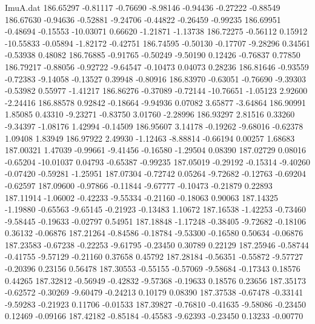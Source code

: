 \begin{filecontents}{ImuA.dat}
 186.65297   -0.81117   -0.76690   -8.98146   -0.94436   -0.27222   -0.88549
 186.67630   -0.94636   -0.52881   -9.24706   -0.44822   -0.26459   -0.99235
 186.69951   -0.48694   -0.15553  -10.03071    0.66620   -1.21871   -1.13738
 186.72275   -0.56112    0.15912  -10.55833   -0.05894   -1.82172   -0.42751
 186.74595   -0.50130   -0.17707   -9.28296    0.34561   -0.53938    0.48082
 186.76885   -0.91765   -0.50249   -9.50190    0.12426   -0.76837    0.77850
 186.79217   -0.88056   -0.92722   -9.64547   -0.10473    0.04073    0.28236
 186.81646   -0.93559   -0.72383   -9.14058   -0.13527    0.39948   -0.80916
 186.83970   -0.63051   -0.76690   -9.39303   -0.53982    0.55977   -1.41217
 186.86276   -0.37089   -0.72144  -10.76651   -1.05123    2.92600   -2.24416
 186.88578    0.92842   -0.18664   -9.94936    0.07082    3.65877   -3.64864
 186.90991    1.85085    0.43310   -9.23271   -0.83750    3.01760   -2.28996
 186.93297    2.81516    0.33260   -9.34397   -1.08176    1.42994   -0.14509
 186.95607    3.14178   -0.19262   -9.68016   -0.62378    1.09408    1.83949
 186.97922    2.49930   -1.12463   -8.88814   -0.66194    0.00257    1.68683
 187.00321    1.47039   -0.99661   -9.41456   -0.16580   -1.29504    0.08390
 187.02729    0.08016   -0.65204  -10.01037    0.04793   -0.65387   -0.99235
 187.05019   -0.29192   -0.15314   -9.40260   -0.07420   -0.59281   -1.25951
 187.07304   -0.72742    0.05264   -9.72682   -0.12763   -0.69204   -0.62597
 187.09600   -0.97866   -0.11844   -9.67777   -0.10473   -0.21879    0.22893
 187.11914   -1.06002   -0.42233   -9.55334   -0.21160   -0.18063    0.90063
 187.14325   -1.19880   -0.65563   -9.65145   -0.21923   -0.13483    1.10672
 187.16538   -1.42253   -0.73460   -9.58445   -0.19633   -0.02797    0.54951
 187.18848   -1.17248   -0.38405   -9.72682   -0.18106    0.36132   -0.06876
 187.21264   -0.84586   -0.18784   -9.53300   -0.16580    0.50634   -0.06876
 187.23583   -0.67238   -0.22253   -9.61795   -0.23450    0.30789    0.22129
 187.25946   -0.58744   -0.41755   -9.57129   -0.21160    0.37658    0.45792
 187.28184   -0.56351   -0.55872   -9.57727   -0.20396    0.23156    0.56478
 187.30553   -0.55155   -0.57069   -9.58684   -0.17343    0.18576    0.44265
 187.32812   -0.56949   -0.42832   -9.57368   -0.19633    0.18576    0.23656
 187.35173   -0.62572   -0.30269   -9.60479   -0.24213    0.10179    0.08390
 187.37538   -0.67478   -0.33141   -9.59283   -0.21923    0.11706   -0.01533
 187.39827   -0.76810   -0.41635   -9.58086   -0.23450    0.12469   -0.09166
 187.42182   -0.85184   -0.45583   -9.62393   -0.23450    0.13233   -0.00770

\end{filecontents}
